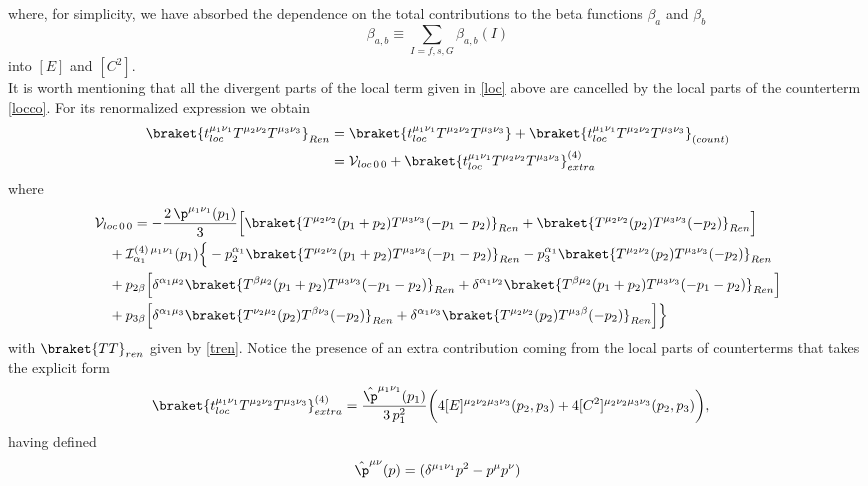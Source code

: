 \documentclass[a4paper,11pt,openright,twoside]{book}
\let\a=\alpha   \let\b=\beta   \let\g=\gamma   \let\d=\delta
\numberwithin{equation}{section}
\begin{document}
{{where, for simplicity, we have absorbed the dependence on the total contributions to the beta functions $\beta_a$ and $\beta_b$ 
\begin{equation}
	\beta_{a,b}\equiv\sum_{I=f,s,G} \beta_{a,b} (I)
\end{equation}
into $[E]$ and $[C^2]$.\\
It is worth mentioning that all the divergent parts of the local term given in \eqref{loc} above are cancelled by the local parts of the counterterm \eqref{locco}. For its renormalized expression we obtain
\begin{align}
	\braket{t_{loc}^{\mu_1\nu_1}T^{\mu_2\nu_2}T^{\mu_3\nu_3}}_{Ren}&=\braket{t_{loc}^{\mu_1\nu_1}T^{\mu_2\nu_2}T^{\mu_3\nu_3}}+\braket{t_{loc}^{\mu_1\nu_1}T^{\mu_2\nu_2}T^{\mu_3\nu_3}}_{(count)}\notag\\
	&=\mathcal{V}_{loc\,0\,0 } +\braket{t_{loc}^{\mu_1\nu_1}T^{\mu_2\nu_2}T^{\mu_3\nu_3}}^{(4)}_{extra}
\end{align}
where
\begin{align}
	&\mathcal{V}_{loc\, 0 \, 0 }=-\frac{2\,\p^{\mu_1\nu_1}(p_1)}{3}\Big[\braket{T^{\mu_2\nu_2}(p_1+p_2)T^{\mu_3\nu_3}(-p_1-p_2)}_{Ren}+\braket{T^{\mu_2\nu_2}(p_2)T^{\mu_3\nu_3}(-p_2)}_{Ren}\Big]
	\notag\\
	&\quad+\mathcal{I}^{(4)\,\mu_1\nu_1}_{\a_1}(p_1)\Big\{-p_2^{\a_1}\braket{T^{\mu_2\nu_2}(p_1+p_2)T^{\mu_3\nu_3}(-p_1-p_2)}_{Ren}-p_3^{\a_1}\braket{T^{\mu_2\nu_2}(p_2)T^{\mu_3\nu_3}(-p_2)}_{Ren}\notag\\
	&\quad+p_{2\b}\Big[\d^{\a_1\mu_2}\braket{T^{\b\mu_2}(p_1+p_2)T^{\mu_3\nu_3}(-p_1-p_2)}_{Ren}+\d^{\a_1\nu_2}\braket{T^{\b\mu_2}(p_1+p_2)T^{\mu_3\nu_3}(-p_1-p_2)}_{Ren}\Big]\notag\\
	&\quad+p_{3\b}\Big[\d^{\a_1\mu_3}\braket{T^{\nu_2\mu_2}(p_2)T^{\b\nu_3}(-p_2)}_{Ren}+\d^{\a_1\nu_3}\braket{T^{\mu_2\nu_2}(p_2)T^{\mu_3\b}(-p_2)}_{Ren}\Big]\Big\}
\end{align}
with $\braket{TT}_{ren}$ given by \eqref{tren}. Notice the presence of an extra contribution coming from the local parts of counterterms that takes the explicit form
\begin{align}
	&\braket{t_{loc}^{\mu_1\nu_1}T^{\mu_2\nu_2}T^{\mu_3\nu_3}}^{(4)}_{extra}=\frac{\hat{\p}^{\mu_1\nu_1}(p_1)}{3 \, p_1^2}\bigg(4[E]^{\mu_2\nu_2\mu_3\nu_3}(p_2,p_3)+4[C^2]^{\mu_2\nu_2\mu_3\nu_3}(p_2,p_3)\bigg),
\end{align}
having defined 
\begin{align}
	\hat{\p}^{\mu\nu}(p)=(\delta^{\mu_1\nu_1}p^2 - p^\mu p^\nu)

\end{align}}}
\end{document}
